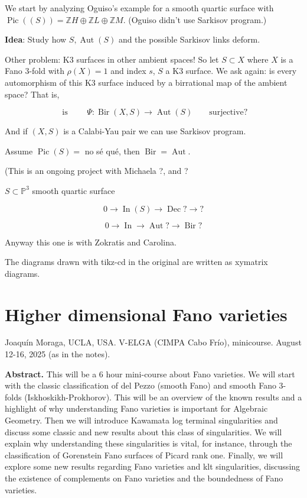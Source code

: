 We start by analyzing Oguiso's example for a
smooth quartic surface with
$\operatorname{Pic}((S))=\mathbb{Z}H \oplus
\mathbb{Z}L \oplus  \mathbb{Z}M$. (Oguiso
didn't use Sarkisov program.)

\textbf{Idea}: Study how $S,
\operatorname{Aut}(S)$ and the possible
Sarkisov links deform.

Other problem: K3 surfaces in other ambient
spaces! So let $S \subset X$ where $X$ is a
Fano 3-fold with $\rho(X)=1$ and index $s$,
$S$ a K3 surface. We ask again: is every
automorphism of this K3 surface induced by a
birrational map of the ambient space? That
is,

$$
\text{ is } \qquad
\Psi:\operatorname{Bir}(X,S) \longrightarrow
\operatorname{Aut}(S)\qquad
\text{surjective?}
$$

And if $(X,S)$ is a Calabi-Yau pair we can
use Sarkisov program.

\begin{proposition}
\label{proposition-paiva-7}
Assume $\operatorname{Pic}(S) = $ no s\'e
qu\'e, then
$\operatorname{Bir}=\operatorname{Aut}$.
\end{proposition}
(This is an ongoing project with Michaela ?,
and ?

\medskip{}

$S \subset \mathbb{P}^3$ smooth quartic
surface

$$
0 \to \operatorname{In}(S) \to
\operatorname{Dec}? \to ?
$$

$$
0 \to \operatorname{In} \to
\operatorname{Aut}? \to \operatorname{Bir}?
$$

Anyway this one is with Zokratis and
Carolina.

\medskip{} The
diagrams drawn with tikz-cd in the original
are written as xymatrix diagrams.

\section{Higher dimensional Fano varieties}
\label{section-moraga-higher-dim-fano}

\noindent
Joaqu\'in Moraga, UCLA, USA.
V-ELGA (CIMPA Cabo Fr\'io), minicourse.
August 12-16, 2025 (as in the notes).

\medskip\noindent
{\bf Abstract.} This will be a 6 hour
mini-course about Fano varieties. We will
start with the classic classification of del
Pezzo (smooth Fano) and smooth Fano 3-folds
(Iskhoskikh-Prokhorov). This will be an
overview of the known results and a highlight
of why understanding Fano varieties is
important for Algebraic Geometry. Then we
will introduce Kawamata log terminal
singularities and discuss some classic and
new results about this class of
singularities. We will explain why
understanding these singularities is vital,
for instance, through the classification of
Gorenstein Fano surfaces of Picard rank one.
Finally, we will explore some new results
regarding Fano varieties and klt
singularities, discussing the existence of
complements on Fano varieties and the
boundedness of Fano varieties.

